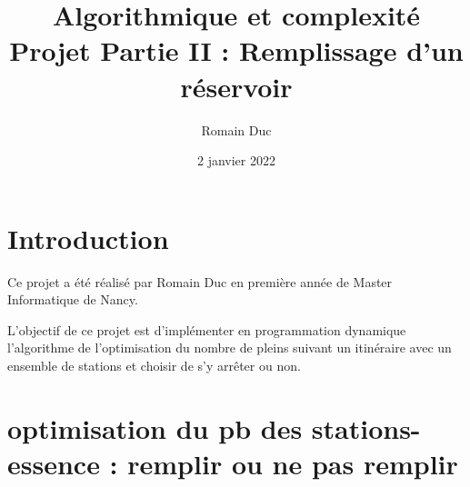 \documentclass[a4paper,11pt]{article}
\title{Algorithmique et complexité Projet Partie II : Remplissage d'un réservoir}
\author{Romain Duc}
\date{2 janvier 2022}
\begin{document}
    \maketitle
    \newpage

    \section{Introduction}\label{sec:introduction}
        Ce projet a été réalisé par Romain Duc en première année de Master Informatique de Nancy.

        L'objectif de ce projet est d'implémenter en programmation dynamique l'algorithme de l'optimisation du nombre de pleins suivant un itinéraire avec un ensemble de stations et choisir de s'y arrêter ou non.
        
    
    \section{optimisation du pb des stations-essence : remplir ou ne pas remplir}
\end{document}
